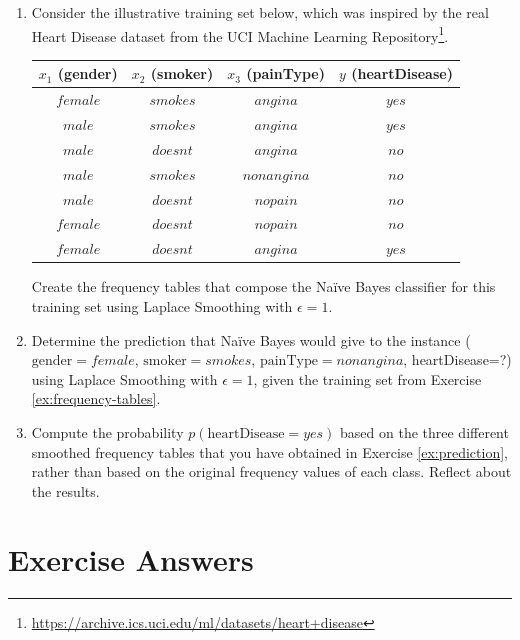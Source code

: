 \begin{enumerate}

\item \label{ex:frequency-tables} Consider the illustrative training set below, which was inspired by the real Heart Disease dataset from the UCI Machine Learning Repository\footnote{\url{https://archive.ics.uci.edu/ml/datasets/heart+disease}}.

\begin{center}
\begin{tabular}{|c|c|c||c|}\hline
$x_1$ (gender) & $x_2$ (smoker) & $x_3$ (painType) & $y$ (heartDisease) \\ \hline
$female$ & $smokes$ & $angina$ & $yes$ \\ \hline
$male$ & $smokes$ & $angina$ & $yes$ \\ \hline
$male$ & $doesnt$ & $angina$ & $no$ \\ \hline
$male$ & $smokes$ & $nonangina$ & $no$ \\ \hline
$male$ & $doesnt$ & $nopain$ & $no$ \\ \hline
$female$ & $doesnt$ & $nopain$ & $no$ \\ \hline
$female$ & $doesnt$ & $angina$ & $yes$\\ \hline
\end{tabular} 
\end{center}

Create the frequency tables that compose the Na\"ive Bayes classifier for this training set using Laplace Smoothing with $\epsilon=1$. 

\item \label{ex:prediction} Determine the prediction that Na\"ive Bayes would give to the instance ($\text{gender}=female$, $\text{smoker}=smokes$, $\text{painType}=nonangina$, heartDisease=?) using Laplace Smoothing with $\epsilon=1$, given the training set from Exercise \ref{ex:frequency-tables}.

\item \label{ex:laplace} Compute the probability $p(\text{heartDisease}=yes)$ based on the three different smoothed frequency tables that you have obtained in Exercise \ref{ex:prediction}, rather than based on the original frequency values of each class. Reflect about the results.

\end{enumerate}



\section{Exercise Answers}



